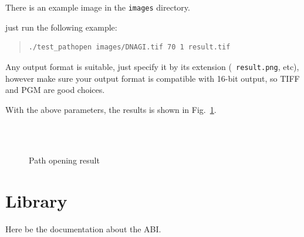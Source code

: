 \documentclass[11pt]{article}
\begin{document}
There is an example image in the {\tt images} directory.

just run the following example:


\begin{quote}
\begin{verbatim}
./test_pathopen images/DNAGI.tif 70 1 result.tif
\end{verbatim}
\end{quote}

Any output format is suitable, just specify it by its extension ({\tt
  result.png}, etc), however make sure your output format is compatible with
16-bit output, so TIFF and PGM are good choices.

With the above parameters, the results is shown in Fig.~\ref{fig:pathopening}.

\begin{figure}
\centering
{}\\
\\
\caption{Path opening result\label{fig:pathopening}}
\end{figure}


\section{Library}

Here be the documentation about the ABI.



\end{document}
